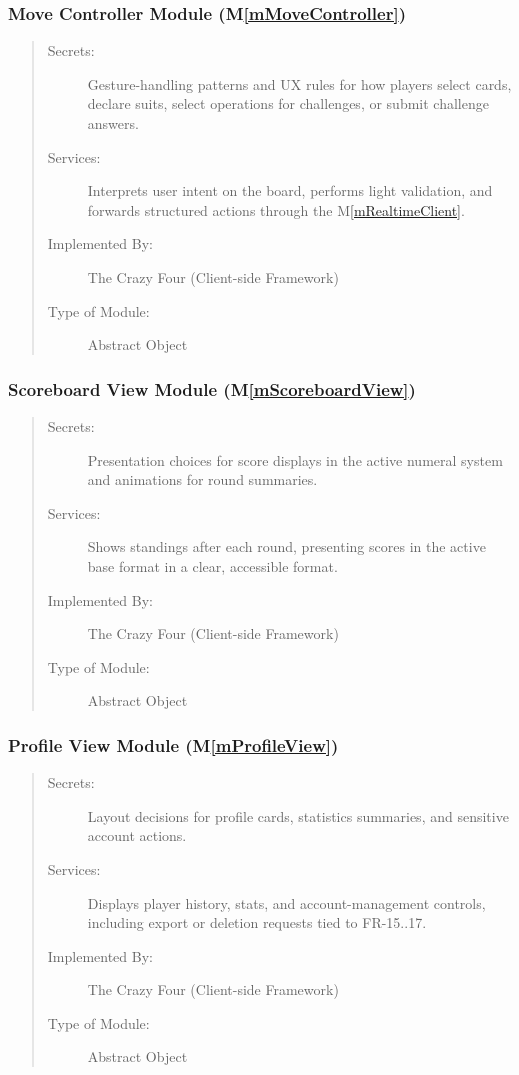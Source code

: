 \documentclass[12pt, titlepage]{article}
\newcommand{\mref}[1]{M\ref{#1}}
\begin{document}
\subsubsection{Move Controller Module (\mref{mMoveController})}
\begin{quote}
\begin{description}
  \item[Secrets:] Gesture-handling patterns and UX rules for how players select cards, declare suits, select operations for challenges, or submit challenge answers.
  \item[Services:] Interprets user intent on the board, performs light validation, and forwards structured actions through the \mref{mRealtimeClient}.
  \item[Implemented By:] The Crazy Four (Client-side Framework)
  \item[Type of Module:] Abstract Object
\end{description}
\end{quote}

\subsubsection{Scoreboard View Module (\mref{mScoreboardView})}
\begin{quote}
\begin{description}
  \item[Secrets:] Presentation choices for score displays in the active numeral system and animations for round summaries.
  \item[Services:] Shows standings after each round, presenting scores in the active base format in a clear, accessible format.
  \item[Implemented By:] The Crazy Four (Client-side Framework)
  \item[Type of Module:] Abstract Object
\end{description}
\end{quote}

\subsubsection{Profile View Module (\mref{mProfileView})}
\begin{quote}
\begin{description}
  \item[Secrets:] Layout decisions for profile cards, statistics summaries, and sensitive account actions.
  \item[Services:] Displays player history, stats, and account-management controls, including export or deletion requests tied to FR-15..17.
  \item[Implemented By:] The Crazy Four (Client-side Framework)
  \item[Type of Module:] Abstract Object
\end{description}
\end{quote}
\end{document}
